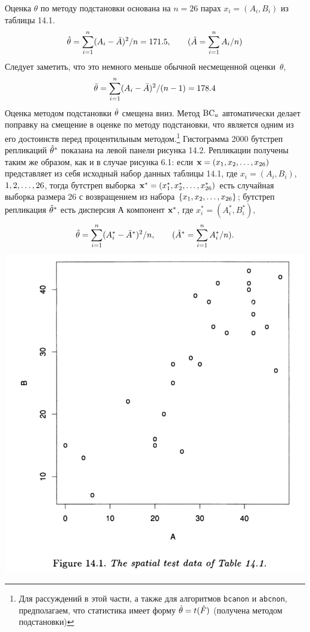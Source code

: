 Оценка $\theta$ по методу подстановки основана на $n=26$ парах $x_i = (A_i, B_i)$ из таблицы 14.1.
\begin{equation}
	\hat \theta = \sum_{i = 1}^{n} (A_i - \bar A)^2/n = 171.5, \qquad (\hat A = \sum_{i = 1}^{n} A_i/n)
\end{equation}
\setcounter{equation}{1}
Следует заметить, что это немного меньше обычной несмещенной оценки~$\theta$,
\begin{equation}
	\bar\theta = \sum_{i = 1}^{n} (A_i - \bar A)^2/(n-1) = 178.4
\end{equation}
\setcounter{equation}{2}
Оценка методом подстановки $\hat \theta$ смещена вниз. Метод $\mathrm{BC}_a$ автоматически делает поправку на смещение в оценке по методу подстановки, что является одним из его достоинств перед процентильным методом.\footnote{Для рассуждений в этой части, а также для алгоритмов \texttt{bcanon} и \texttt{abcnon}, предполагаем, что статистика имеет форму $\hat \theta = t(\hat F)$ (получена методом подстановки)}
Гистограмма 2000 бутстреп репликаций $\hat \theta^*$ показана на левой панели рисунка 14.2. Репликации получены таким же образом, как и в случае рисунка 6.1: если $\mathbf x = (x_1,x_2,\ldots,x_{26})$ представляет из себя исходный набор данных таблицы 14.1, где $x_i = (A_i,B_i)$, $1,2,\ldots,26$, тогда бутстреп выборка $\mathbf x^* = (x_1^*,x_2^*,\ldots,x_{26}^*)$ есть случайная выборка размера 26 с возвращением из набора $\{x_1,x_2,\ldots,x_{26}\}$; бутстреп репликация $\hat \theta^*$ есть дисперсия А компонент $\bf x^*$, где $x_i^* = (A_i^*, B_i^*),$
\begin{equation}
	\hat \theta = \sum_{i = 1}^{n} (A_i^* - \bar A^*)^2/n, \qquad (\hat A^* = \sum_{i = 1}^{n} A_i^*/n).
\end{equation}
\includegraphics[width=0.85\linewidth]{14/f141.png}
